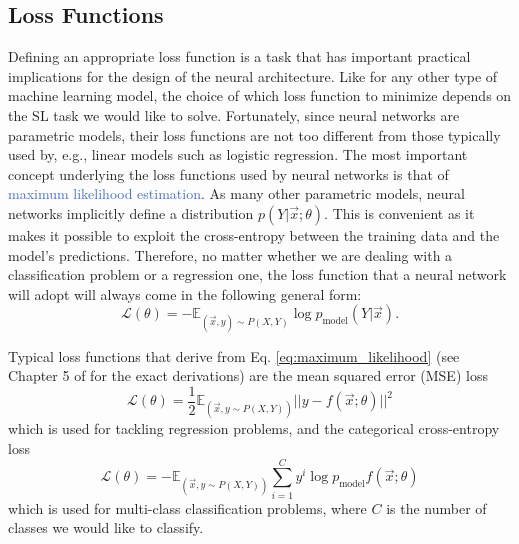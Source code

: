 \subsection{Loss Functions}
\label{sec:loss_functions}
Defining an appropriate loss function is a task that has important practical implications for the design of the neural architecture. Like for any other type of machine learning model, the choice of which loss function to minimize depends on the SL task we would like to solve. Fortunately, since neural networks are parametric models, their loss functions are not too different from those typically used by, e.g.,  linear models such as logistic regression. The most important concept underlying the loss functions used by neural networks is that of \textcolor{RoyalBlue}{maximum likelihood estimation}. As many other parametric models, neural networks implicitly define a distribution $p(Y|\vec{x};\theta)$. This is convenient as it makes it possible to exploit the cross-entropy between the training data and the model's predictions. Therefore, no matter whether we are dealing with a classification problem or a regression one, the loss function that a neural network will adopt will always come in the following general form:
\begin{equation}
	\mathscr{L}(\theta) = - \mathds{E}_{(\vec{x},y)\sim P(X,Y)} \log p_\text{model} (Y|\vec{x}).
	\label{eq:maximum_likelihood}
\end{equation}

Typical loss functions that derive from Eq. \ref{eq:maximum_likelihood} (see Chapter 5 of \cite{goodfellow2016deep} for the exact derivations) are the mean squared error (MSE) loss
\begin{equation}
	\mathscr{L}(\theta) = \frac{1}{2}\mathds{E}_{(\vec{x},y\sim P(X,Y))} ||y - f(\vec{x};\theta) ||^{2}
	\label{eq:mean_squared_error}
\end{equation}
which is used for tackling regression problems, and the categorical cross-entropy loss
\begin{equation}
	\mathscr{L}(\theta) = - \mathds{E}_{(\vec{x},y\sim P(X,Y))} \sum_{i=1}^{C} y^{i} \log p_\text{model} f(\vec{x};\theta)
	\label{eq:cross_entropy}
\end{equation}
which is used for multi-class classification problems, where $C$ is the number of classes we would like to classify. 

